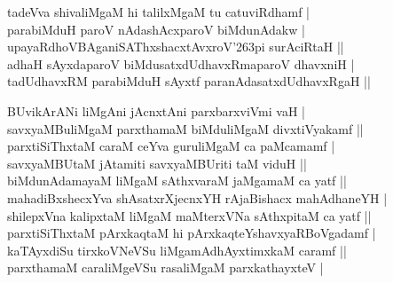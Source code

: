 \begin{entry}
\begin{shl}
\end{shl}
\medskip
{}
\smallskip
{}
\medskip
\begin{shl}
tadeVva shivaliMgaM hi talilxMgaM tu catuviRdhamf |\\[2pt]
parabiMduH paroV nAdashAcxparoV biMdunAdakw |\\[2pt]
upayaRdhoVBAganiSAThxshacxtAvxroV{\char'263}pi surAciRtaH ||\\[2pt]
adhaH sAyxdaparoV biMdusatxdUdhavxRmaparoV dhavxniH |\\[2pt]
tadUdhavxRM parabiMduH sAyxtf paranAdasatxdUdhavxRgaH ||\\[-1pt]
\end{shl}
\medskip
{}
\smallskip
{}
\medskip
\begin{shl}
BUvikArANi liMgAni jAcnxtAni parxbarxviVmi vaH |\\[2pt]
savxyaMBuliMgaM parxthamaM biMduliMgaM divxtiVyakamf ||\\[2pt]
parxtiSiThxtaM caraM ceYva guruliMgaM ca paMcamamf |\\[2pt]
savxyaMBUtaM jAtamiti savxyaMBUriti taM viduH ||\\[2pt]
biMdunAdamayaM liMgaM sAthxvaraM jaMgamaM ca yatf ||\\[2pt]
mahadiBxshecxYva shAsatxrXjecnxYH rAjaBishacx mahAdhaneYH |\\[2pt]
shilepxVna kalipxtaM liMgaM maMterxVNa sAthxpitaM ca yatf ||\\[2pt]
parxtiSiThxtaM pArxkaqtaM hi pArxkaqteYshavxyaRBoVgadamf |\\[2pt]
kaTAyxdiSu tirxkoVNeVSu liMgamAdhAyxtimxkaM caramf ||\\[2pt]
parxthamaM caraliMgeVSu rasaliMgaM parxkathayxteV |\\[2pt]

\end{shl}
\end{entry}
